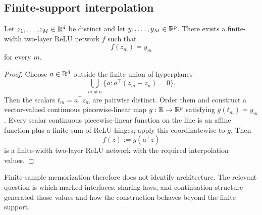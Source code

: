 \subsection{Finite-support interpolation}

\begin{proposition}\label{prop:supp-finite-interpolation}
Let $z_1,\ldots,z_M\in\mathbb{R}^d$ be distinct and let $y_1,\ldots,y_M\in\mathbb{R}^p$. There exists a finite-width two-layer ReLU network $f$ such that
\[
f(z_m)=y_m
\]
for every $m$.
\end{proposition}

\begin{proof}
Choose $a\in\mathbb{R}^d$ outside the finite union of hyperplanes
\[
\bigcup_{m\neq n}\{a:a^\top(z_m-z_n)=0\}.
\]
Then the scalars $t_m=a^\top z_m$ are pairwise distinct. Order them and construct a vector-valued continuous piecewise-linear map $g:\mathbb{R}\to\mathbb{R}^p$ satisfying $g(t_m)=y_m$. Every scalar continuous piecewise-linear function on the line is an affine function plus a finite sum of ReLU hinges; apply this coordinatewise to $g$. Then
\[
f(z):=g(a^\top z)
\]
is a finite-width two-layer ReLU network with the required interpolation values.
\end{proof}

Finite-sample memorization therefore does not identify architecture. The relevant question is which marked interfaces, sharing laws, and continuation structure generated those values and how the construction behaves beyond the finite support.

